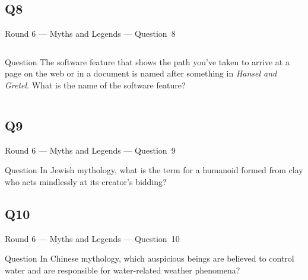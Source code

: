 \documentclass[11pt]{beamer}
\begin{document}
\subsection*{Q8}
\begin{frame}[t]{Round 6 --- Myths and Legends --- \mbox{Question 8}}
\vspace{-0.5em}
\begin{columns}[T,totalwidth=\linewidth]
\begin{column}{0.32\linewidth}
\begin{block}{Question}
The software feature that shows the path you've taken to arrive at a page on the web or in a document is named after something in \emph{Hansel and Gretel}.  What is the name of the software feature? 
\end{block}
\end{column}
\begin{column}{0.65\linewidth}
\begin{center}
\texttt{[image: \{Images/breadcrumbs]}.png}
\end{center}
\end{column}
\end{columns}
\end{frame}
\subsection*{Q9}
\begin{frame}[t]{Round 6 --- Myths and Legends --- \mbox{Question 9}}
\vspace{-0.5em}
\begin{block}{Question}
In Jewish mythology, what is the term for a humanoid formed from clay who acts mindlessly at its creator's bidding?
\end{block}
\end{frame}
\subsection*{Q10}
\begin{frame}[t]{Round 6 --- Myths and Legends --- \mbox{Question 10}}
\vspace{-0.5em}
\begin{block}{Question}
In Chinese mythology, which auspicious beings are believed to control water and are responsible for water-related weather phenomena?
\end{block}
\end{frame}
\end{document}
